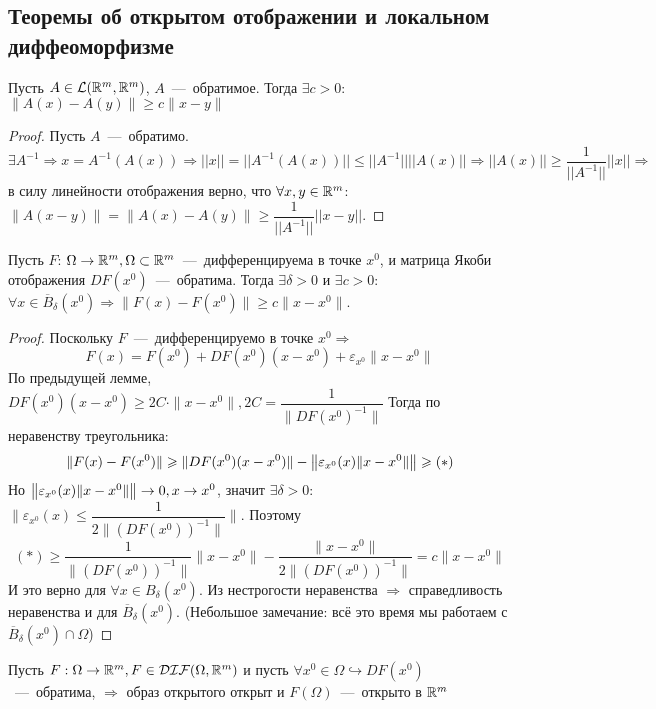 \subsection{Теоремы об открытом отображении и локальном диффеоморфизме}
\begin{lemma}
    Пусть $A \in \mathcal{L}(\R^m, \R^m)$,  $A$~---~обратимое. Тогда $\exists c > 0$: $\|A(x) - A(y)\| \geq c\|x - y\|$
\end{lemma}
\begin{proof}
    Пусть $A$~---~обратимо. $\exists A^{-1} \Rightarrow x = A^{-1}(A(x)) \Rightarrow ||x|| = ||A^{-1}(A(x))|| \leq ||A^{-1}||||A(x)|| \Rightarrow ||A(x)|| \geq \dfrac{1}{||A^{-1}||} ||x|| \Rightarrow$ в силу линейности отображения верно, что $\forall x, y \in \R^m$: $\|A(x - y)\| = \|A(x) - A(y)\| \geq \dfrac{1}{||A^{-1}||}||x - y||$.
\end{proof}
\begin{theorem}
    Пусть $F$: $\Omega \rightarrow \R^m, \Omega \subset \R^m$~---~дифференцируема в точке $x^0$, и матрица Якоби отображения $DF(x^0)$~---~обратима. Тогда $\exists \delta > 0$ и $\exists c > 0$: $\forall x \in \overline{B}_\delta(x^0) \Rightarrow \|F(x) - F(x^0)\| \geq c \|x - x^{0}\|$.
\end{theorem}
\begin{proof}
    Поскольку $F$~---~дифференцируемо в точке $x^0 \Rightarrow$
    \[F(x) = F(x^0) + DF(x^0)(x - x^0) + \varepsilon_{x^0}\|x - x^0\|\]
    По предыдущей лемме, $DF(x^0)(x - x^0) \geq 2C \cdot \|x - x^0\|, 2C = \dfrac{1}{\|DF(x^0)^{-1}\|}$
    Тогда по неравенству треугольника: \[\|F(x) - F(x^0)\| \geq \|DF(x^0)(x - x^0)\| - \big{\|} \varepsilon_{x^0}(x)\|x - x^0\|\big{\|} \geq (*)\]
    Но $\big{\|} \varepsilon_{x^0}(x)\| x - x^0 \| \big{\|} \rightarrow 0, x \rightarrow x^0$, значит $\exists \delta > 0$: $\|\varepsilon_{x^0}(x) \leq \dfrac{1}{2\|(DF(x^0))^{-1}\|}\|$. Поэтому
    \[(*) \geq \dfrac{1}{\|(DF(x^0))^{-1}\|} \|x - x^0 \| - \dfrac{\|x - x^0\|}{2\|(DF(x^0))^{-1}\|} = c\|x - x^0\|\]
    И это верно для $\forall x \in B_\delta(x^0)$. Из нестрогости неравенства $\Rightarrow$ справедливость неравенства и для $\overline{B}_\delta(x^0)$. (Небольшое замечание: всё это время мы работаем с $\overline{B}_\delta(x^0) \cap \Omega$)
\end{proof}
\begin{theorem}
    Пусть $F: \Omega \rightarrow \R^m, F \in \DIF(\Omega, \R^m)$ и пусть $\forall x^0 \in \Omega \hookrightarrow DF(x^0)$~---~обратима, $\Rightarrow$ образ открытого открыт и $F(\Omega)$~---~открыто в $\R^m$
\end{theorem}
